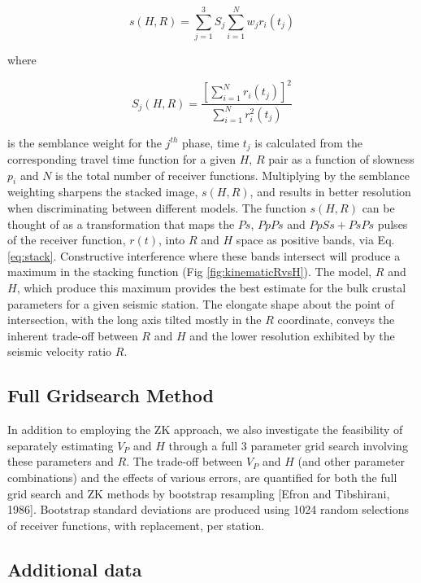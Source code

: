 \documentclass[draft, 12pt]{article}
\begin{document}
\begin{equation}  \label{eq:stack}
s(H,R) = \sum_{j=1}^{3} S_j \sum_{i=1}^N w_jr_i(t_j)
\end{equation}

where

\begin{equation}
S_j(H,R) = \frac {\left[ \sum_{i=1}^N r_i(t_j) \right]^2}
                 { \sum_{i=1}^N r_i^2(t_j) }
\end{equation}

is the semblance weight for the $j^{th}$ phase, time $t_j$ is calculated from the corresponding travel time function for a given $H$, $R$ pair as a function of slowness $p_i$ and $N$ is the total number of receiver functions. Multiplying by the semblance weighting sharpens the stacked image, $s(H,R)$, and results in better resolution when discriminating between different models. The function $s(H,R)$ can be thought of as a transformation that maps the $Ps$, $PpPs$ and $PpSs+PsPs$ pulses of the receiver function, $r(t)$, into $R$ and $H$ space as positive bands, via Eq. \ref{eq:stack}. Constructive interference where these bands intersect will produce a maximum in the stacking function (Fig \ref{fig:kinematicRvsH}). The model, $R$ and $H$, which produce this maximum provides the best estimate for the bulk crustal parameters for a given seismic station. The elongate shape about the point of intersection, with the long axis tilted mostly in the $R$ coordinate, conveys the inherent trade-off between $R$ and $H$ and the lower resolution exhibited by the seismic velocity ratio $R$.


\subsection{Full Gridsearch Method}

In addition to employing the ZK approach, we also investigate the feasibility of separately estimating $V_P$ and $H$ through a full 3 parameter grid search involving these parameters and $R$. The trade-off between $V_P$ and $H$ (and other parameter combinations) and the effects of various errors, are quantified for both the full grid search and ZK methods by bootstrap resampling [Efron and Tibshirani, 1986]. Bootstrap standard deviations are produced using 1024 random selections of receiver functions, with replacement, per station.

\subsection{Additional data}
\end{document}
